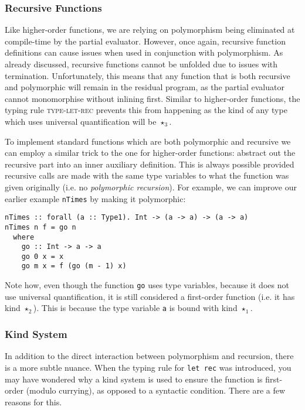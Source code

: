 \documentclass[runningheads]{llncs}
\begin{document}
\subsubsection{Recursive Functions}

Like higher-order functions, we are relying on polymorphism being eliminated at compile-time by the partial evaluator. However, once again, recursive function definitions can cause issues when used in conjunction with polymorphism. As already discussed, recursive functions cannot be unfolded due to issues with termination. Unfortunately, this means that any function that is both recursive and polymorphic will remain in the residual program, as the partial evaluator cannot monomorphise without inlining first. Similar to higher-order functions, the typing rule \textsc{type-let-rec} prevents this from happening as the kind of any type which uses universal quantification will be $\star_3$.

To implement standard functions which are both polymorphic and recursive we can employ a similar trick to the one for higher-order functions: abstract out the recursive part into an inner auxiliary definition. This is always possible provided recursive calls are made with the same type variables to what the function was given originally (i.e. no \textit{polymorphic recursion}). For example, we can improve our earlier example \texttt{nTimes} by making it polymorphic:

\begin{verbatim}
nTimes :: forall (a :: Type1). Int -> (a -> a) -> (a -> a)
nTimes n f = go n
  where
    go :: Int -> a -> a
    go 0 x = x
    go m x = f (go (m - 1) x)
\end{verbatim}

Note how, even though the function \texttt{go} uses type variables, because it does not use universal quantification, it is still considered a first-order function (i.e. it has kind $\star_2$). This is because the type variable \texttt{a} is bound with kind $\star_1$.

\subsubsection{Kind System} \label{sec:kind-system}

In addition to the direct interaction between polymorphism and recursion, there is a more subtle nuance. When the typing rule for \texttt{let rec} was introduced, you may have wondered why a kind system is used to ensure the function is first-order (modulo currying), as opposed to a syntactic condition. There are a few reasons for this.
\end{document}
